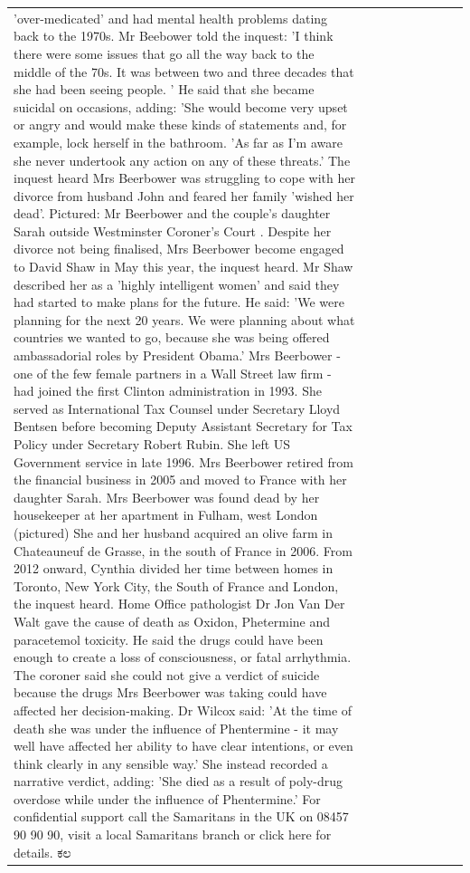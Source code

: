 \begin{table}[H]
\begin{tabular}{lllrlllll}
'over-medicated' and had mental health problems dating back to the 1970s. Mr Beebower told the inquest: 'I think there were some issues that go all the way back to the middle of the 70s. It was between two and three decades that she had been seeing people. ' He said that she became suicidal on occasions, adding: 'She would become very upset or angry and would make these kinds of statements and, for example, lock herself in the bathroom. 'As far as I'm aware she never undertook any action on any of these threats.' The inquest heard Mrs Beerbower was struggling to cope with her divorce from husband John and feared her family 'wished her dead'. Pictured: Mr Beerbower and the couple's daughter Sarah outside Westminster Coroner's Court . Despite her divorce not being finalised, Mrs Beerbower become engaged to David Shaw in May this year, the inquest heard. Mr Shaw described her as a 'highly intelligent women' and said they had started to make plans for the future. He said: 'We were planning for the next 20 years. We were planning about what countries we wanted to go, because she was being offered ambassadorial roles by President Obama.' Mrs Beerbower - one of the few female partners in a Wall Street law firm - had joined the first Clinton administration in 1993. She served as International Tax Counsel under Secretary Lloyd Bentsen before becoming Deputy Assistant Secretary for Tax Policy under Secretary Robert Rubin. She left US Government service in late 1996. Mrs Beerbower retired from the financial business in 2005 and moved to France with her daughter Sarah. Mrs Beerbower was found dead by her housekeeper at her apartment in Fulham, west London (pictured) She and her husband acquired an olive farm in Chateauneuf de Grasse, in the south of France in 2006. From 2012 onward, Cynthia divided her time between homes in Toronto, New York City, the South of France and London, the inquest heard. Home Office pathologist Dr Jon Van Der Walt gave the cause of death as Oxidon, Phetermine and paracetemol toxicity. He said the drugs could have been enough to create a loss of consciousness, or fatal arrhythmia. The coroner said she could not give a verdict of suicide because the drugs Mrs Beerbower was taking could have affected her decision-making. Dr Wilcox said: 'At the time of death she was under the influence of Phentermine - it may well have affected her ability to have clear intentions, or even think clearly in any sensible way.' She instead recorded a narrative verdict, adding: 'She died as a result of poly-drug overdose while under the influence of Phentermine.' For confidential support call the Samaritans in the UK on 08457 90 90 90, visit a local Samaritans branch or click here for details. ಕಲ \\

\end{tabular}
\end{table}
